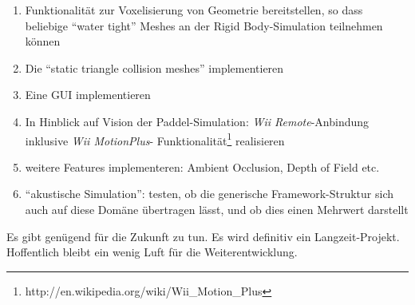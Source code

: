 \begin{enumerate}
		\item Funktionalität zur Voxelisierung von Geometrie bereitstellen, so dass beliebige "`water tight"' Meshes
		an der Rigid Body-Simulation teilnehmen können
		\item Die "`static triangle collision meshes"' implementieren
		\item Eine GUI implementieren
		\item In Hinblick auf Vision der Paddel-Simulation: \emph{Wii Remote}-Anbindung inklusive \emph{Wii MotionPlus}-
		Funktionalität\footnote{http://en.wikipedia.org/wiki/Wii\_Motion\_Plus} realisieren
		\item weitere Features implementeren: Ambient Occlusion, Depth of Field etc.
		\item "`akustische Simulation"': testen, ob die generische Framework-Struktur sich auch auf diese Domäne
			übertragen lässt, und ob dies einen Mehrwert darstellt
	\end{enumerate}

	Es gibt genügend für die Zukunft zu tun. Es wird definitiv ein Langzeit-Projekt.
	Hoffentlich bleibt ein wenig Luft für die Weiterentwicklung.


\clearpage
